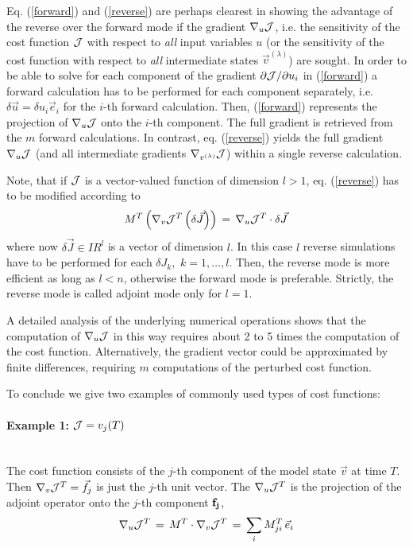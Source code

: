 Eq. (\ref{forward}) and (\ref{reverse}) are perhaps clearest in
showing the advantage of the reverse over the forward mode
if the gradient $\nabla _{u}{\cal J}$, i.e. the sensitivity of the
cost function $ {\cal J} $ with respect to {\it all} input
variables $u$
(or the sensitivity of the cost function with respect to
{\it all} intermediate states $ \vec{v}^{(\lambda)} $) are sought.
In order to be able to solve for each component of the gradient
$ \partial {\cal J} / \partial u_{i} $ in (\ref{forward})
a forward calculation has to be performed for each component separately,
i.e. $ \delta \vec{u} = \delta u_{i} {\vec{e}_{i}} $ 
for  the $i$-th forward calculation. 
Then, (\ref{forward}) represents the
projection of $ \nabla_u {\cal J} $ onto the $i$-th component.
The full gradient is retrieved from the $ m $ forward calculations.
In contrast, eq. (\ref{reverse}) yields the full 
gradient $\nabla _{u}{\cal J}$ (and all intermediate gradients
$\nabla _{v^{(\lambda)}}{\cal J}$) within a single reverse calculation.

Note, that if $ {\cal J} $ is a vector-valued function
of dimension $ l > 1 $,
eq. (\ref{reverse}) has to be modified according to
\[
M^T \left( \nabla_v {\cal J}^T \left(\delta \vec{J}\right) \right) 
\, = \,
\nabla_u {\cal J}^T \cdot \delta \vec{J}
\]
where now $ \delta \vec{J} \in I\!\!R^l $ is a vector of 
dimension $ l $.
In this case $ l $ reverse simulations have to be performed
for each $ \delta J_{k}, \,\, k = 1, \ldots, l $.
Then, the reverse mode is more efficient as long as
$ l < n $, otherwise the forward mode is preferable.
Strictly, the reverse mode is called adjoint mode only for
$ l = 1 $.

A detailed analysis of the underlying numerical operations 
shows that the computation of $\nabla _{u}{\cal J}$ in this way
requires about 2 to 5 times the computation of the cost function.
Alternatively, the gradient vector could be approximated
by finite differences, requiring $m$ computations
of the perturbed cost function.

To conclude we give two examples of commonly used types
of cost functions:

\paragraph{Example 1: 
$ {\cal J} = v_{j} (T) $} ~ \\
The cost function consists of the $j$-th component of the model state
$ \vec{v} $ at time $T$. 
Then $ \nabla_v {\cal J}^T = {\vec{f}_{j}} $ is just the $j$-th
unit vector. The $ \nabla_u {\cal J}^T $ 
is the projection of the adjoint
operator onto the $j$-th component ${\bf f_{j}}$,
\[
\nabla_u {\cal J}^T 
\, = \, M^T \cdot \nabla_v {\cal J}^T
\, = \,  \sum_{i} M^T_{ji} \, {\vec{e}_{i}}
\]

